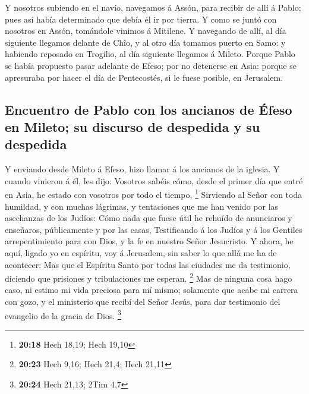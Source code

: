  Y nosotros subiendo en el navío, navegamos á Assón, para
recibir de allí á Pablo; pues así había determinado que debía él ir por
tierra.  Y como se juntó con nosotros en Assón, tomándole
vinimos á Mitilene.  Y navegando de allí, al día siguiente
llegamos delante de Chîo, y al otro día tomamos puerto en Samo: y
habiendo reposado en Trogilio, al día siguiente llegamos á Mileto.
 Porque Pablo se había propuesto pasar adelante de Efeso;
por no detenerse en Asia: porque se apresuraba por hacer el día de
Pentecostés, si le fuese posible, en Jerusalem.

\hypertarget{encuentro-de-pablo-con-los-ancianos-de-uxe9feso-en-mileto-su-discurso-de-despedida-y-su-despedida}{%
\subsection{Encuentro de Pablo con los ancianos de Éfeso en Mileto; su
discurso de despedida y su
despedida}\label{encuentro-de-pablo-con-los-ancianos-de-uxe9feso-en-mileto-su-discurso-de-despedida-y-su-despedida}}

 Y enviando desde Mileto á Efeso, hizo llamar á los
ancianos de la iglesia.  Y cuando vinieron á él, les dijo:
Vosotros sabéis cómo, desde el primer día que entré en Asia, he estado
con vosotros por todo el tiempo, \footnote{\textbf{20:18} Hech 18,19;
  Hech 19,10}  Sirviendo al Señor con toda humildad, y con
muchas lágrimas, y tentaciones que me han venido por las asechanzas de
los Judíos:  Cómo nada que fuese útil he rehuído de
anunciaros y enseñaros, públicamente y por las casas, 
Testificando á los Judíos y á los Gentiles arrepentimiento para con
Dios, y la fe en nuestro Señor Jesucristo.  Y ahora, he
aquí, ligado yo en espíritu, voy á Jerusalem, sin saber lo que allá me
ha de acontecer:  Mas que el Espíritu Santo por todas las
ciudades me da testimonio, diciendo que prisiones y tribulaciones me
esperan. \footnote{\textbf{20:23} Hech 9,16; Hech 21,4; Hech 21,11}
 Mas de ninguna cosa hago caso, ni estimo mi vida preciosa
para mí mismo; solamente que acabe mi carrera con gozo, y el ministerio
que recibí del Señor Jesús, para dar testimonio del evangelio de la
gracia de Dios. \footnote{\textbf{20:24} Hech 21,13; 2Tim 4,7}

